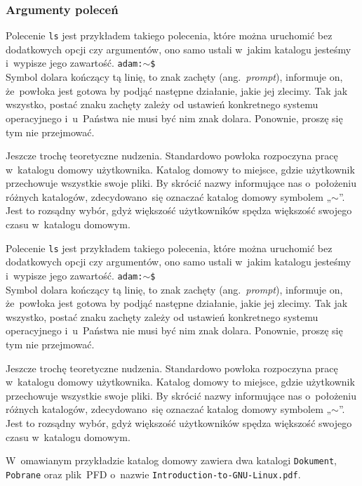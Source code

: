 \documentclass[10pt,t]{beamer}
\begin{document}
\begin{frame}
  \frametitle{Argumenty poleceń}


  Polecenie \texttt{ls} jest przykładem takiego polecenia, które można
  uruchomić bez dodatkowych opcji czy argumentów, ono samo ustali w~jakim
  katalogu jesteśmy i~wypisze jego zawartość.
  \texttt{adam:$\sim$\$} \\
  Symbol dolara kończący tą linię, to znak zachęty (ang.~\textit{prompt}),
  informuje on, że~powłoka jest gotowa by podjąć następne działanie, jakie
  jej zlecimy. Tak jak wszystko, postać znaku zachęty zależy od ustawień
  konkretnego systemu operacyjnego i~u~Państwa nie musi być nim znak dolara.
  Ponownie, proszę się tym nie przejmować.

  Jeszcze trochę teoretyczne nudzenia. Standardowo powłoka rozpoczyna pracę
  w~katalogu domowy użytkownika. Katalog domowy to miejsce, gdzie użytkownik
  przechowuje wszystkie swoje pliki. By skrócić nazwy informujące nas
  o~położeniu różnych katalogów, zdecydowano~się oznaczać katalog domowy
  symbolem „$\sim$”. Jest to rozsądny wybór, gdyż większość użytkowników
  spędza większość swojego czasu w~katalogu domowym.

  Polecenie \texttt{ls} jest przykładem takiego polecenia, które można
  uruchomić bez dodatkowych opcji czy argumentów, ono samo ustali w~jakim
  katalogu jesteśmy i~wypisze jego zawartość.
  \texttt{adam:$\sim$\$} \\
  Symbol dolara kończący tą linię, to znak zachęty (ang.~\textit{prompt}),
  informuje on, że~powłoka jest gotowa by podjąć następne działanie, jakie
  jej zlecimy. Tak jak wszystko, postać znaku zachęty zależy od ustawień
  konkretnego systemu operacyjnego i~u~Państwa nie musi być nim znak dolara.
  Ponownie, proszę się tym nie przejmować.

  Jeszcze trochę teoretyczne nudzenia. Standardowo powłoka rozpoczyna pracę
  w~katalogu domowy użytkownika. Katalog domowy to miejsce, gdzie użytkownik
  przechowuje wszystkie swoje pliki. By skrócić nazwy informujące nas
  o~położeniu różnych katalogów, zdecydowano~się oznaczać katalog domowy
  symbolem „$\sim$”. Jest to rozsądny wybór, gdyż większość użytkowników
  spędza większość swojego czasu w~katalogu domowym.



  W~omawianym przykładzie katalog domowy zawiera dwa katalogi
  \texttt{Dokument}, \texttt{Pobrane} oraz plik~PFD o~nazwie
  \texttt{Introduction-to-GNU-Linux.pdf}.


\end{frame}
\end{document}
